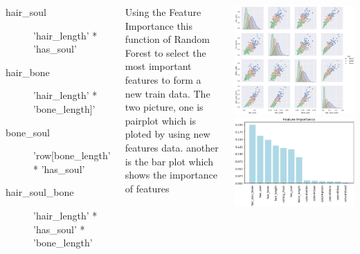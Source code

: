 \documentclass{tikzposter} %
\begin{document}
\begin{columns}
{  	\begin{description}
  		\item[hair\_soul] ’hair\_length’ * ’has\_soul’
  		\item[hair\_bone] 'hair\_length' * 'bone\_length]'
  		\item[bone\_soul] 'row[bone\_length' * 'has\_soul'
  		\item[hair\_soul\_bone]  'hair\_length' * 'has\_soul' * 'bone\_length' 
  	\end{description}
    Using the Feature Importance 
    this function of Random Forest
    to select the most important features
    to form a new train data.
    The two picture, one is pairplot 
    which is ploted by using new features data.
    another is the bar plot which shows 
    the importance of features
  	
  	\begin{center}
  		\includegraphics[width=.3\linewidth]{figures/hist_1.eps}
  		\includegraphics[width=.3\linewidth]{figures/FEATURE.eps}
  	\end{center}

}



\end{columns}
\end{document}
